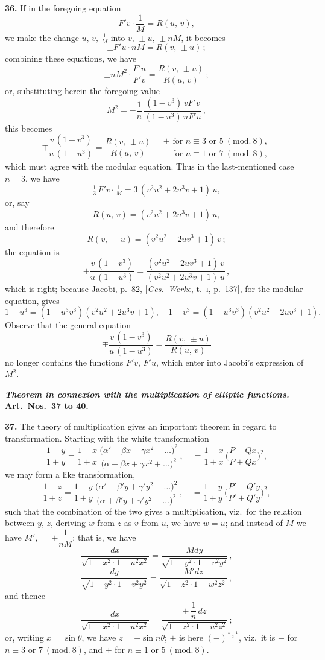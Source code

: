\documentclass[11pt]{article}
\providecommand{\modd}{\mathrm{mod}}
\begin{document}
\textbf{36.} If in the foregoing equation
\[
F'v\cdot\frac{1}{M}=R(u,\,v),
\]
we make the change $u,\,v,\,\frac{1}{M}$ into $v,\,\pm u,\,\pm nM$, it becomes
\[
\pm F'u\cdot nM = R(v,\,\pm u)\,;
\]
combining these equations, we have
\[
\pm nM^2\cdot\frac{F'u}{F'v}=\frac{R(v,\,\pm u)}{R(u,\,v)}\,;
\]
or, substituting herein the foregoing value
\[
M^2=-\frac{1}{n}\,\frac{(1-v^3)\,vF'v}{(1-u^3)\,uF'u}\,,
\]
this becomes
\[
\mp\frac{v\,(1-v^3)}{u\,(1-u^3)}=\frac{R(v,\,\pm u)}{R(u,\,v)}
\quad
\begin{array}{l}+ \text{ for } n\equiv 3 \text{ or } 5\ (\modd.\ 8),\\
- \text{ for } n\equiv 1 \text{ or } 7\ (\modd.\ 8),\end{array}
\]
which must agree with the modular equation. Thus in the last-mentioned case $n=3$,
we have
\[
\tfrac{1}{3}\,F'v\cdot\tfrac{1}{M}=3\,(v^2 u^2+2u^3 v+1)\,u,
\]
or, say
\[
R(u,\,v) = (v^2 u^2 + 2u^3 v + 1)\,u,
\]
and therefore
\[
R(v,\,-u) = (v^2 u^2 - 2u v^3 + 1)\,v\,;
\]
the equation is
\[
+\frac{v\,(1-v^3)}{u\,(1-u^3)} = \frac{(v^2 u^2 - 2u v^3 + 1)\,v}{(v^2 u^2 + 2u^3 v + 1)\,u}\,,
\]
which is right; because Jacobi, p.~82, [\textit{Ges.\ Werke}, t.~\textsc{i}, p.~137], for
the modular equation, gives
\[
1 - u^3 = (1 - u^3 v^3)(v^2 u^2 + 2u^3 v + 1),\quad
1 - v^3 = (1 - u^3 v^3)(v^2 u^2 - 2u v^3 + 1).
\]
Observe that the general equation
\[
\mp\frac{v\,(1-v^3)}{u\,(1-u^3)} = \frac{R(v,\,\pm u)}{R(u,\,v)}
\]
no longer contains the functions $F'v,\,F'u$, which enter into Jacobi's
expression of $M^2$.

\bigskip

\noindent\textbf{\textit{Theorem in connexion with the multiplication of elliptic functions.}\quad
Art.\ Nos.\ 37 to 40.}

\medskip

\textbf{37.} The theory of multiplication gives an important theorem in regard to
transformation. Starting with the white transformation
\[
\frac{1-y}{1+y} = \frac{1-x}{1+x}\,\frac{\bigl(\alpha'-\beta x+\gamma x^2-\ldots\bigr)^2}{\bigl(\alpha+\beta x+\gamma x^2+\ldots\bigr)^2}\,,
\quad
= \frac{1-x}{1+x}\,\biggl(\frac{P-Qx}{P+Qx}\biggr)^{\!2},
\]
we may form a like transformation,
\[
\frac{1-z}{1+z} = \frac{1-y}{1+y}\,\frac{\bigl(\alpha'-\beta' y+\gamma' y^2-\ldots\bigr)^2}{\bigl(\alpha+\beta' y+\gamma' y^2+\ldots\bigr)^2}\,,
\quad
= \frac{1-y}{1+y}\,\biggl(\frac{P'-Q' y}{P'+Q' y}\biggr)^{\!2}\!,
\]
such that the combination of the two gives a multiplication, viz.\ for the relation
between $y,\,z$, deriving $w$ from $z$ as $v$ from $u$, we have $w=u$; and instead of $M$ we
have $M'$, $=\pm\dfrac{1}{nM}$; that is, we have
\[
\frac{dx}{\sqrt{1-x^2\cdot 1 - u^2 x^2}} = \frac{Mdy}{\sqrt{1-y^2\cdot 1 - v^2 y^2}}\,,
\]
\[
\frac{dy}{\sqrt{1-y^2\cdot 1 - v^2 y^2}} = \frac{M'dz}{\sqrt{1-z^2\cdot 1 - w^2 z^2}}\,,
\]
and thence
\[
\frac{dx}{\sqrt{1-x^2\cdot 1 - u^2 x^2}} = \frac{\pm\,\dfrac{1}{n}\,dz}{\sqrt{1-z^2\cdot 1 - u^2 z^2}}\,;
\]
or, writing $x=\sin\theta$, we have $z=\pm\sin n\theta$; $\pm$ is here $(-)^{\frac{n-1}{2}}$,
viz.\ it is $-$ for $n\equiv 3$ or $7\ (\modd.\ 8)$, and $+$ for $n\equiv 1$ or $5\ (\modd.\ 8)$.
\end{document}
